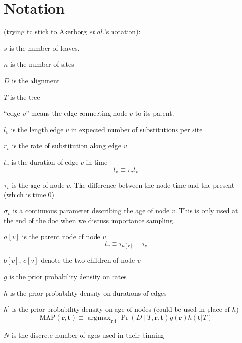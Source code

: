 \documentclass{llncs}
\newcommand{\etal}[0]{{\em et al.}\xspace}
\newcommand{\numLeaves}[0]{\ensuremath{s}\xspace}
\newcommand{\numSites}[0]{\ensuremath{n}\xspace}
\newcommand{\dataMatrix}[0]{\ensuremath{D}\xspace}
\newcommand{\tree}[0]{\ensuremath{T}\xspace}
\newcommand{\edgeLen}[1]{\ensuremath{l_{#1}}\xspace}
\newcommand{\rate}[1]{\ensuremath{r_{#1}}\xspace}
\newcommand{\ratevec}[0]{\ensuremath{\mathbf{r}}\xspace}
\newcommand{\timevec}[0]{\ensuremath{\mathbf{t}}\xspace}
\newcommand{\contTime}[1]{\ensuremath{\sigma}_{#1}\xspace}
\newcommand{\duration}[1]{\ensuremath{t_{#1}}\xspace}
\newcommand{\age}[1]{\ensuremath{\tau_{#1}}\xspace}
\newcommand{\parent}[1]{\ensuremath{a[{#1}]}\xspace}
\newcommand{\firstChild}[1]{\ensuremath{b[{#1}]}\xspace}
\newcommand{\secondChild}[1]{\ensuremath{c[{#1}]}\xspace}
\newcommand{\ratePriorDensity}[0]{\ensuremath{g}\xspace}
\newcommand{\timePriorDensity}[0]{\ensuremath{h}\xspace}
\newcommand{\agePriorDensity}[0]{\ensuremath{h^{\prime}}\xspace}
\newcommand{\numAges}[0]{\ensuremath{N}\xspace}
\DeclareMathOperator*{\argmax}{\arg\!\max}
\begin{document}
\section{Notation}
(trying to stick to Akerborg \etal's notation):
\begin{compactitem}
    \item[\numLeaves] is the number of leaves.
    \item[\numSites] is the number of sites
    \item[\dataMatrix] is the alignment
    \item[\tree] is the tree
    \item[``edge $v$''] means the edge connecting node $v$ to its parent.
    \item[\edgeLen{v}] is the length edge $v$ in expected number of substitutions per site
    \item[\rate{v}] is the rate of substitution along edge $v$
    \item[\duration{v}] is the duration of edge $v$ in time
\begin{equation}
    \edgeLen{v} \equiv \rate{v}\duration{v}
\end{equation}
    \item[\age{v}] is the age of node $v$. The difference between the node time and the present (which is time 0)
    \item[$\contTime{v}$] is a continuous parameter describing the age of node $v$. This is only used at the end of the doc when we discuss importance sampling.
    \item[\parent{v}] is the parent node of node $v$
\begin{equation}
    \duration{v} \equiv \age{\parent{v}} - \age{v}
\end{equation}
    \item[\firstChild{v}, \secondChild{v}] denote the two children of node $v$
    \item[\ratePriorDensity] is the prior probability density on rates
    \item[\timePriorDensity] is the prior probability density on durations of edges
    \item[\agePriorDensity] is the prior probability density on age of nodes (could be used in place of \timePriorDensity)
\begin{equation}
    \mbox{MAP}(\ratevec, \timevec)  \equiv \argmax_{\ratevec, \timevec} \Pr\left(\dataMatrix \mid \tree, \ratevec, \timevec\right) \ratePriorDensity(\ratevec) \timePriorDensity(\timevec | T)
\end{equation}
    \item[\numAges] is the discrete number of ages used in their binning
\end{compactitem}
\end{document}

